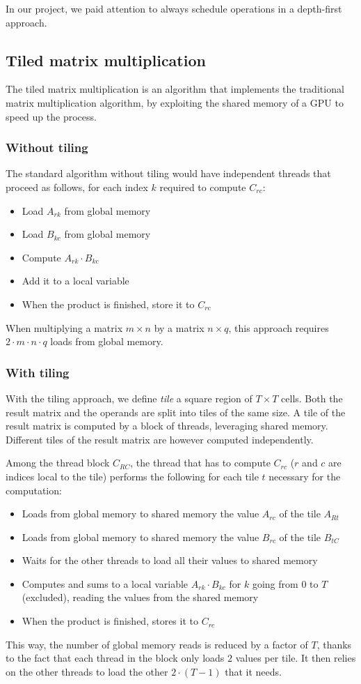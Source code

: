 In our project, we paid attention to always schedule operations in a depth-first approach.

\subsection{Tiled matrix multiplication}

The tiled matrix multiplication is an algorithm that implements the traditional matrix multiplication algorithm, by exploiting the shared memory of a GPU to speed up the process.

\subsubsection{Without tiling}

The standard algorithm without tiling would have independent threads that proceed as follows, for each index $k$ required to compute $C_{rc}$:
\begin{itemize}
	\itemsep 0em
	\item Load $A_{rk}$ from global memory
	\item Load $B_{kc}$ from global memory
	\item Compute $A_{rk} \cdot B_{kc}$
	\item Add it to a local variable
	\item When the product is finished, store it to $C_{rc}$
\end{itemize}

When multiplying a matrix $m \times n$ by a matrix $n \times q$, this approach requires $2 \cdot m \cdot n \cdot q$ loads from global memory.

\subsubsection{With tiling}

With the tiling approach, we define \textit{tile} a square region of $T \times T$ cells.
Both the result matrix and the operands are split into tiles of the same size.
A tile of the result matrix is computed by a block of threads, leveraging shared memory.
Different tiles of the result matrix are however computed independently.

Among the thread block $C_{RC}$, the thread that has to compute $C_{rc}$ ($r$ and $c$ are indices local to the tile) performs the following for each tile $t$ necessary for the computation:
\begin{itemize}
	\itemsep 0em
	\item Loads from global memory to shared memory the value $A_{rc}$ of the tile $A_{Rt}$
	\item Loads from global memory to shared memory the value $B_{rc}$ of the tile $B_{tC}$
	\item Waits for the other threads to load all their values to shared memory
	\item Computes and sums to a local variable $A_{rk} \cdot B_{kc}$ for $k$ going from $0$ to $T$ (excluded), reading the values from the shared memory
	\item When the product is finished, stores it to $C_{rc}$
\end{itemize}

This way, the number of global memory reads is reduced by a factor of $T$, thanks to the fact that each thread in the block only loads $2$ values per tile.
It then relies on the other threads to load the other $2\cdot(T-1)$ that it needs.
